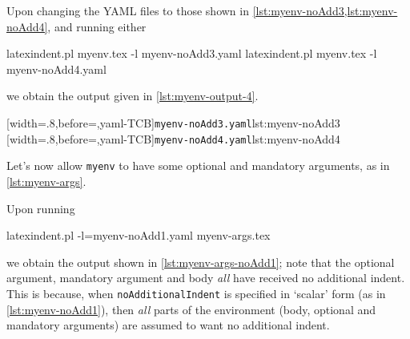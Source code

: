  \begin{example}
 Upon changing the YAML files to those shown in \cref{lst:myenv-noAdd3,lst:myenv-noAdd4},
 and running either 

 \begin{commandshell}
latexindent.pl myenv.tex -l myenv-noAdd3.yaml  
latexindent.pl myenv.tex -l myenv-noAdd4.yaml  
\end{commandshell}

 we obtain the output given in \cref{lst:myenv-output-4}.

 \begin{cmhtcbraster}
  [width=.8\linewidth,before=\centering,yaml-TCB]{\texttt{myenv-noAdd3.yaml}}{lst:myenv-noAdd3}
  [width=.8\linewidth,before=\centering,yaml-TCB]{\texttt{myenv-noAdd4.yaml}}{lst:myenv-noAdd4}
 \end{cmhtcbraster}

 \end{example}

 \begin{example}
 Let's now allow \texttt{myenv} to have some optional and mandatory arguments, as in
 \cref{lst:myenv-args}.


 Upon running 

 \begin{commandshell}
latexindent.pl -l=myenv-noAdd1.yaml myenv-args.tex  
\end{commandshell}

 we obtain the output shown in \cref{lst:myenv-args-noAdd1}; note that the optional
 argument, mandatory argument and body \emph{all} have received no additional indent. This
 is because, when \texttt{noAdditionalIndent} is specified in `scalar' form (as in
 \cref{lst:myenv-noAdd1}), then \emph{all} parts of the environment (body, optional and
 mandatory arguments) are assumed to want no additional indent.
 \end{example}

